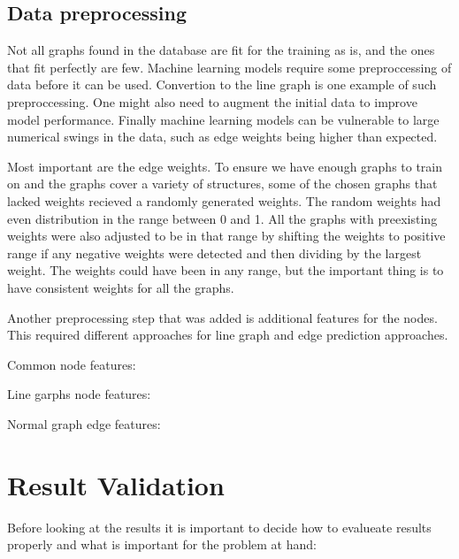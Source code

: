 \subsection{Data preprocessing}
\label{sec:preprocessing}
Not all graphs found in the database are fit for the training as is, and the ones that fit perfectly are few. Machine learning models require some preproccessing of data before it can be used. Convertion to the line graph is one example of such preproccessing. One might also need to augment the initial data to improve model performance. Finally machine learning models can be vulnerable to large numerical swings in the data, such as edge weights being higher than expected.

Most important are the edge weights. To ensure we have enough graphs to train on and the graphs cover a variety of structures, some of the chosen graphs that lacked weights recieved a randomly generated weights. The random weights had even distribution in the range between 0 and 1. All the graphs with preexisting weights were also adjusted to be in that range by shifting the weights to positive range if any negative weights were detected and then dividing by the largest weight. The weights could have been in any range, but the important thing is to have consistent weights for all the graphs. 

Another preprocessing step that was added is additional features for the nodes. This required different approaches for line graph and edge prediction approaches.

Common node features:

Line garphs node features:

Normal graph edge features:

\section{Result Validation}

Before looking at the results it is important to decide how to evalueate results properly and what is important for the problem at hand:

